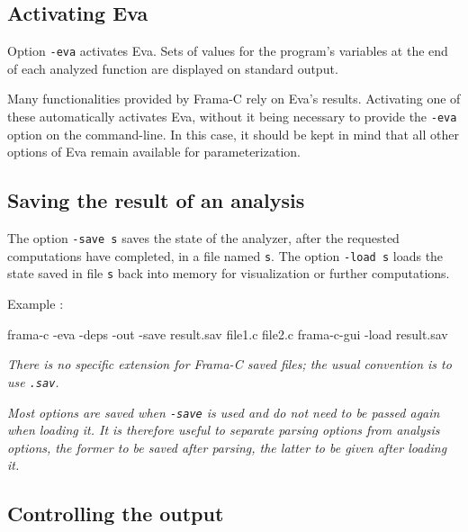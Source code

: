 \documentclass[web]{frama-c-book}
\makeatletter
\newenvironment{important}%
{\hspace{5pt plus \linewidth minus \marginparsep}%
 \begin{lrbox}{\@tempboxa}%
   \begin{minipage}{\linewidth - 2\fboxsep}\itshape}
{\end{minipage}\end{lrbox}\colorbox{gris}{\usebox{\@tempboxa}}}
\newcommand{\Eva}{\textsf{Eva}}
\makeatother
\begin{document}
\subsection{Activating \Eva{}}

Option \lstinline|-eva| activates \Eva{}. Sets of
values for the program's variables at the end of each analyzed function
are displayed on standard output.

Many functionalities provided by Frama-C rely on \Eva{}'s
results. Activating one of these automatically activates \Eva{},
without it being necessary to provide the \lstinline|-eva|
option on the command-line.  In this case, it should be kept in mind
that all other options of \Eva{} remain available for
parameterization.

\subsection{Saving the result of an analysis}
\label{saving-result}

The option \lstinline|-save s|
saves the state of the analyzer, after the requested 
computations have completed,
in a file named \lstinline|s|.
The option \lstinline|-load s| loads the state saved in file \lstinline|s| 
back into memory for visualization or further computations.
\medskip

Example :
\begin{shell}
frama-c -eva -deps -out -save result.sav file1.c file2.c
frama-c-gui -load result.sav
\end{shell}

\begin{important}
  There is no specific extension for Frama-C saved files; the usual
  convention is to use \verb|.sav|.
\end{important}

\begin{important}
  Most options are saved when \verb|-save| is used and do not need to
  be passed again when loading it. It is therefore useful to separate
  parsing options from analysis options, the former to be saved after
  parsing, the latter to be given after loading it.
\end{important}

\subsection{Controlling  the output}
\end{document}
